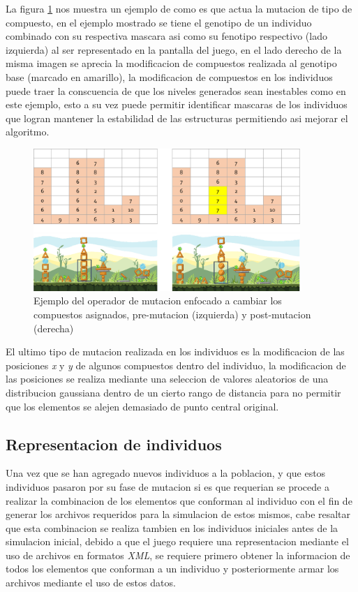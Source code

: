 La figura \ref{figure:mutate_composite} nos muestra un ejemplo de como es que
actua la mutacion de tipo de compuesto, en el ejemplo mostrado se tiene el
genotipo de un individuo combinado con su respectiva mascara asi como su
fenotipo respectivo (lado izquierda) al ser representado en la pantalla del
juego, en el lado derecho de la misma imagen se aprecia la modificacion de
compuestos realizada al genotipo base (marcado en amarillo), la modificacion de
compuestos en los individuos puede traer la conscuencia de que los niveles
generados sean inestables como en este ejemplo, esto a su vez puede permitir
identificar mascaras de los individuos que logran mantener la estabilidad de las
estructuras permitiendo asi mejorar el algoritmo.

\begin{figure}
  \centering
  \includegraphics[width=0.9\textwidth]{img/mutation_composite.png}
  \caption{Ejemplo del operador de mutacion enfocado a cambiar los compuestos asignados, pre-mutacion (izquierda) y post-mutacion (derecha)}
  \label{figure:mutate_composite}
\end{figure}

El ultimo tipo de mutacion realizada en los individuos es la modificacion de las
posiciones \textit{x} y \textit{y} de algunos compuestos dentro del individuo,
la modificacion de las posiciones se realiza mediante una seleccion de valores
aleatorios de una distribucion gaussiana dentro de un cierto rango de distancia
para no permitir que los elementos se alejen demasiado de punto central
original.

\subsection{Representacion de individuos}
\label{section:individual_representation}

Una vez que se han agregado nuevos individuos a la poblacion, y que estos
individuos pasaron por su fase de mutacion si es que requerian se procede a
realizar la combinacion de los elementos que conforman al individuo con el fin
de generar los archivos requeridos para la simulacion de estos mismos, cabe
resaltar que esta combinacion se realiza tambien en los individuos iniciales
antes de la simulacion inicial, debido a que el juego requiere una
representacion mediante el uso de archivos en formatos \textit{XML}, se requiere
primero obtener la informacion de todos los elementos que conforman a un
individuo y posteriormente armar los archivos mediante el uso de estos datos.

